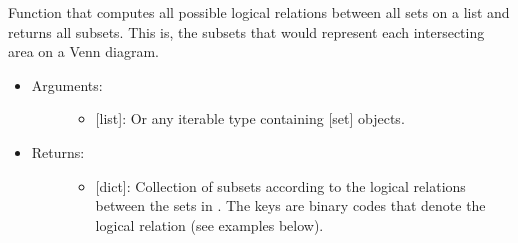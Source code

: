 \documentclass[letterpaper,10pt,english]{sphinxmanual}
\begin{document}
\begin{fulllineitems}
\label{\detokenize{iterables:data_tools.iterables.subsets}}
Function that computes all possible logical relations between all
sets on a list  and returns all subsets. This is, the subsets
that would represent each intersecting area on a Venn diagram.
\begin{itemize}
\item {} \begin{description}
\item[{Arguments:}] \leavevmode\begin{itemize}
\item {} 
 {[}list{]}: Or any iterable type containing {[}set{]} objects.

\end{itemize}

\end{description}

\item {} \begin{description}
\item[{Returns:}] \leavevmode\begin{itemize}
\item {} 
{[}dict{]}: Collection of subsets according to the logical
relations between the sets in . The keys are binary codes
that denote the logical relation (see examples below).

\end{itemize}

\end{description}


\end{itemize}
\end{fulllineitems}
\end{document}
